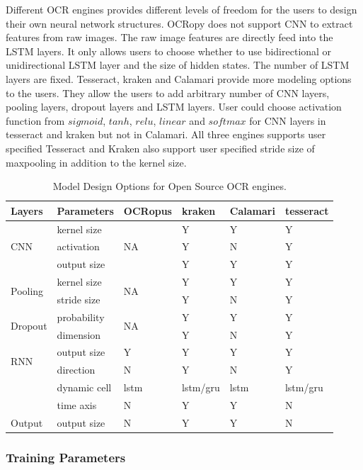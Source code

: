 \documentclass[conference]{IEEEtran}
\begin{document}
Different OCR engines provides different levels of freedom for the users to design their own neural network structures. OCRopy does not support CNN to extract features from raw images. The raw image features are directly feed into the LSTM layers. It only allows users to choose whether to use bidirectional or unidirectional LSTM layer and the size of hidden states. The number of LSTM layers are fixed. Tesseract, kraken and Calamari provide more modeling options to the users. They allow the users to add arbitrary number of CNN layers, pooling layers, dropout layers and LSTM layers. User could choose activation function from $sigmoid$, $tanh$, $relu$, $linear$ and $softmax$ for CNN layers in tesseract and kraken but not in Calamari. All three engines supports user specified  Tesseract and Kraken also support user specified stride size of maxpooling in addition to the kernel size.

\begin{table}[bt]
\begin{tabular}{llllll}
\hline
Layers   &Parameters & OCRopus     & kraken                      & Calamari & tesseract\\ \hline
\multirow{ 3}{*}{CNN} & kernel size & \multirow{ 3}{*}{NA} & Y & Y & Y  \\
& activation &  & Y & N & Y \\
& output size & & Y & Y &  Y\\\hline
\multirow{2}{*}{Pooling} &kernel size & \multirow{2}{*}{NA} &  Y & Y & Y \\
& stride size &  & Y & N & Y \\\hline
\multirow{2}{*}{Dropout} &probability & \multirow{2}{*}{NA} &  Y & Y & Y\\
&dimension &  & Y & N & Y \\\hline
\multirow{2}{*}{RNN} & output size & Y &  Y & Y & Y\\
& direction & N & Y & N & Y \\
& dynamic cell & lstm & lstm/gru & lstm & lstm/gru\\
& time axis& N & Y & Y & N \\\hline
Output & output size& N & Y & Y & N \\\hline
\end{tabular}
\caption{Model Design Options for Open Source OCR engines.}
\label{tab:model_param1}
\end{table}
\subsubsection*{Training Parameters}
\end{document}
